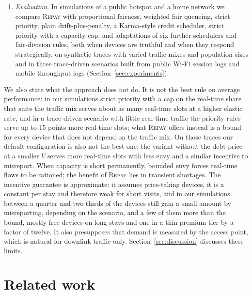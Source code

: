 \documentclass[preprint,11pt]{elsarticle}
\theoremstyle{definition}
\theoremstyle{remark}
\newcommand{\repay}{\textsc{Repay}}
\begin{document}
\begin{enumerate}[leftmargin=*,itemsep=2pt]
\item \emph{Evaluation.} In simulations of a public hotspot and a home network we compare \repay{} with proportional fairness, weighted fair queueing, strict priority, plain drift-plus-penalty, a Karma-style credit scheduler, strict priority with a capacity cap, and adaptations of six further schedulers and fair-division rules, both when devices are truthful and when they respond strategically, on synthetic traces with varied traffic mixes and population sizes and in three trace-driven scenarios built from public Wi-Fi session logs and mobile throughput logs (Section~\ref{sec:experiments}).
\end{enumerate}

We also state what the approach does not do. It is not the best rule on average performance: in our simulations strict priority with a cap on the real-time share that suits the traffic mix serves about as many real-time slots at a higher elastic rate, and in a trace-driven scenario with little real-time traffic the priority rules serve up to $15$ points more real-time slots; what \repay{} offers instead is a bound for every device that does not depend on the traffic mix. On those traces our default configuration is also not the best one: the variant without the debt price at a smaller $V$ serves more real-time slots with less envy and a similar incentive to misreport. When capacity is short permanently, bounded envy forces real-time flows to be rationed; the benefit of \repay{} lies in transient shortages. The incentive guarantee is approximate: it assumes price-taking devices, it is a constant per stay and therefore weak for short visits, and in our simulations between a quarter and two thirds of the devices still gain a small amount by misreporting, depending on the scenario, and a few of them more than the bound, mostly free devices on long stays and one in a thin premium tier by a factor of twelve. It also presupposes that demand is measured by the access point, which is natural for downlink traffic only.
Section~\ref{sec:discussion} discusses these limits.


\section{Related work}\label{sec:related}
\end{document}
